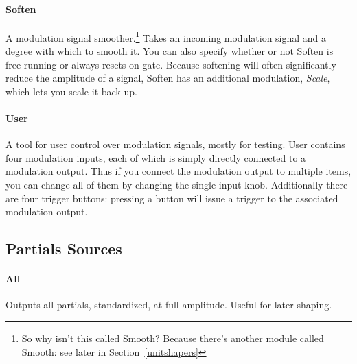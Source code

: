 \documentclass{article}
\begin{document}
\paragraph{Soften}  A modulation signal smoother.\footnote{So why isn't this called Smooth?  Because there's another module called Smooth: see later in Section~\ref{unitshapers}}  Takes an incoming modulation signal and a degree with which to smooth it.  You can also specify whether or not Soften is free-running or always resets on gate.   Because softening will often significantly reduce the amplitude of a signal, Soften has an additional modulation, {\it Scale}, which lets you scale it back up.


\paragraph{User}  A tool for user control over modulation signals, mostly for testing.  User contains four modulation inputs, each of which is simply directly connected to a modulation output.  Thus if you connect the modulation output to multiple items, you can change all of them by changing the single input knob. Additionally there are four trigger buttons: pressing a button will issue a trigger to the associated modulation output.



\subsection{Partials Sources}

\paragraph{All}  Outputs all partials, standardized, at full amplitude.  Useful for later shaping.

\end{document}
